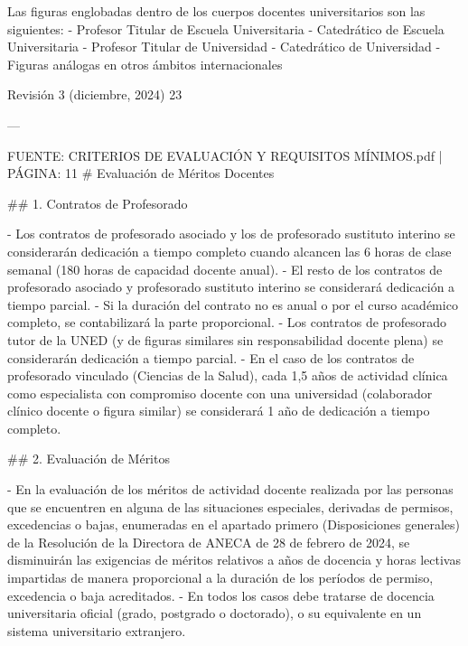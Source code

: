 \documentclass{article}
\begin{document}
\begin{itemize}
\begin{itemize}
\begin{scriptsize}
                  Las figuras englobadas dentro de los cuerpos docentes universitarios son las siguientes:
                  - Profesor Titular de Escuela Universitaria
                  - Catedrático de Escuela Universitaria
                  - Profesor Titular de Universidad
                  - Catedrático de Universidad
                  - Figuras análogas en otros ámbitos internacionales

                  Revisión 3 (diciembre, 2024) 23

                  ---

                  FUENTE: CRITERIOS DE EVALUACIÓN Y REQUISITOS MÍNIMOS.pdf | PÁGINA: 11
                  \# Evaluación de Méritos Docentes

                  \#\# 1. Contratos de Profesorado

                  - Los contratos de profesorado asociado y los de profesorado sustituto interino se considerarán dedicación a tiempo completo cuando alcancen las 6 horas de clase semanal (180 horas de capacidad docente anual).
                  - El resto de los contratos de profesorado asociado y profesorado sustituto interino se considerará dedicación a tiempo parcial.
                  - Si la duración del contrato no es anual o por el curso académico completo, se contabilizará la parte proporcional.
                  - Los contratos de profesorado tutor de la UNED (y de figuras similares sin responsabilidad docente plena) se considerarán dedicación a tiempo parcial.
                  - En el caso de los contratos de profesorado vinculado (Ciencias de la Salud), cada 1,5 años de actividad clínica como especialista con compromiso docente con una universidad (colaborador clínico docente o figura similar) se considerará 1 año de dedicación a tiempo completo.

                  \#\# 2. Evaluación de Méritos

                  - En la evaluación de los méritos de actividad docente realizada por las personas que se encuentren en alguna de las situaciones especiales, derivadas de permisos, excedencias o bajas, enumeradas en el apartado primero (Disposiciones generales) de la Resolución de la Directora de ANECA de 28 de febrero de 2024, se disminuirán las exigencias de méritos relativos a años de docencia y horas lectivas impartidas de manera proporcional a la duración de los períodos de permiso, excedencia o baja acreditados.
                  - En todos los casos debe tratarse de docencia universitaria oficial (grado, postgrado o doctorado), o su equivalente en un sistema universitario extranjero.


\end{scriptsize}
\end{itemize}
\end{itemize}
\end{document}
